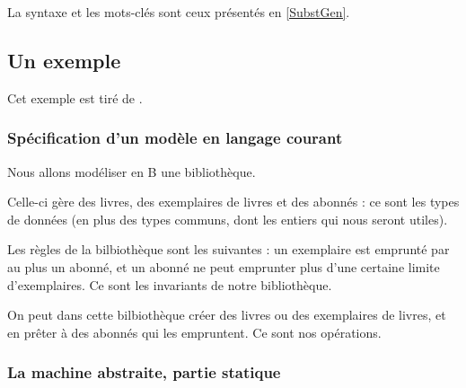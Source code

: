 \documentclass[10pt,a4paper]{article}
\newcommand{\Bequal}{\mathrel{\widehat{=}}}
\begin{document}
La syntaxe et les mots-clés sont ceux présentés en \cref{SubstGen}.

\subsection{Un exemple}

Cet exemple est tiré de \cite{introB}.


\subsubsection{Spécification d'un modèle en langage courant}

Nous allons modéliser en B une bibliothèque.

Celle-ci gère des livres, des exemplaires de livres et des abonnés : ce sont les types de données (en plus des types communs, dont les entiers qui nous seront utiles).

Les règles de la bilbiothèque sont les suivantes : un exemplaire est emprunté par au plus un abonné, et un abonné ne peut emprunter plus d'une certaine limite d'exemplaires. Ce sont les invariants de notre bibliothèque.

On peut dans cette bilbiothèque créer des livres ou des exemplaires de livres, et en prêter à des abonnés qui les empruntent. Ce sont nos opérations.

\subsubsection{La machine abstraite, partie statique}
\end{document}
